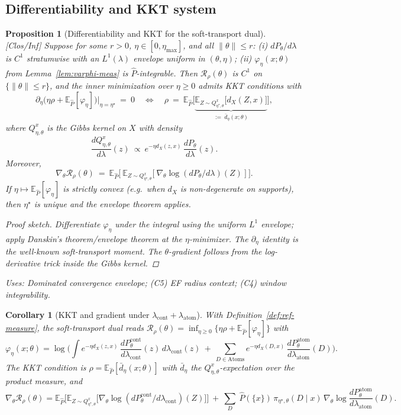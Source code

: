 \documentclass[10pt]{article}
\newcommand{\uses}[1]{\par\smallskip\noindent\textit{Uses: }#1\par\smallskip}
\newenvironment{proofsketch}{\begin{proof}[Proof sketch]}{\end{proof}}
\newcommand{\cont}{{\mathrm{cont}}}
\newcommand{\atom}{{\mathrm{atom}}}
\newtheorem{proposition}{Proposition}
\newtheorem{corollary}{Corollary}
\begin{document}
\subsection{Differentiability and KKT system}\label{subsec:kkt}

\begin{proposition}[Differentiability and KKT for the soft-transport dual]\label{prop:kkt}
\emph{[\textup{Clos/Inf}]} Suppose for some $r>0$, $\eta\in[0,\eta_{\max}]$, and all $\|\theta\|\le r$:
(i) $dP_\theta/d\lambda$ is $C^1$ stratumwise with an $L^1(\lambda)$ envelope uniform in $(\theta,\eta)$;
(ii) $\varphi_\eta(x;\theta)$ from Lemma~\ref{lem:varphi-meas} is $\hat P$-integrable.
Then $\mathcal R_\rho(\theta)$ is $C^1$ on $\{\|\theta\|\le r\}$, and the inner minimization over $\eta\ge 0$ admits KKT conditions with
\[
\partial_\eta \Big(\eta\rho+\mathbb E_{\hat P}[\varphi_\eta]\Big)\bigg|_{\eta=\eta^\star}\ =\ 0
\quad\Longleftrightarrow\quad
\rho\ =\ \mathbb E_{\hat P}\Big[\underbrace{\mathbb E_{Z\sim Q_{\eta^\star,\theta}^x}\big[d_X(Z,x)\big]}_{:=\ \bar d_\eta(x;\theta)}\Big],
\]
where $Q_{\eta,\theta}^x$ is the Gibbs kernel on $X$ with density
\[
\frac{dQ_{\eta,\theta}^x}{d\lambda}(z)\ \propto\ e^{-\eta d_X(z,x)}\,\frac{dP_\theta}{d\lambda}(z).
\]
Moreover,
\[
\nabla_\theta \mathcal R_\rho(\theta)\ =\ \mathbb E_{\hat P}\Big[\ \mathbb E_{Z\sim Q_{\eta^\star,\theta}^x}\big[\ \nabla_\theta \log (dP_\theta/d\lambda)(Z)\ \big]\ \Big].
\]
If $\eta\mapsto \mathbb E_{\hat P}[\varphi_\eta]$ is strictly convex (e.g.\ when $d_X$ is non-degenerate on supports), then $\eta^\star$ is unique and the envelope theorem applies.
\begin{proofsketch}
Differentiate $\varphi_\eta$ under the integral using the uniform $L^1$ envelope; apply Danskin’s theorem/envelope theorem at the $\eta$-minimizer. The $\partial_\eta$ identity is the well-known soft-transport moment. The $\theta$-gradient follows from the log-derivative trick inside the Gibbs kernel.
\end{proofsketch}
\uses{Dominated convergence envelope; (C5) EF radius context; (C4) window integrability.}
\end{proposition}

\begin{corollary}[KKT and gradient under $\lambda_{\cont}+\lambda_{\atom}$]\label{cor:kkt-mixed}
With Definition~\ref{def:ref-measure}, the soft-transport dual reads
$\mathcal R_\rho(\theta)=\inf_{\eta\ge0}\{\eta\rho+\mathbb E_{\hat P}[\varphi_\eta]\}$ with
\[
\varphi_\eta(x;\theta)=\log\!\Big(\int e^{-\eta d_X(z,x)}\,\frac{dP^{\cont}_\theta}{d\lambda_{\cont}}(z)\,d\lambda_{\cont}(z)\ +\ \sum_{D\in\mathrm{Atoms}} e^{-\eta d_X(D,x)}\,\frac{dP^{\atom}_\theta}{d\lambda_{\atom}}(D)\Big).
\]
The KKT condition is $\rho=\mathbb E_{\hat P}[\bar d_\eta(x;\theta)]$ with $\bar d_\eta$ the $Q^{x}_{\eta,\theta}$-expectation over the \emph{product} measure, and
\[
\nabla_\theta \mathcal R_\rho(\theta)=\mathbb E_{\hat P}\!\Big[\mathbb E_{Z\sim Q^{x}_{\eta^\star,\theta}}\big[\nabla_\theta\log(dP^{\cont}_\theta\!/d\lambda_{\cont})(Z)\big]\Big]\ +\ \sum_{D}\ \hat P(\{x\})\,\pi_{\eta^\star,\theta}(D\mid x)\,\nabla_\theta\log\frac{dP^\atom_\theta}{d\lambda_{\atom}}(D).
\]
\end{corollary}
\end{document}

